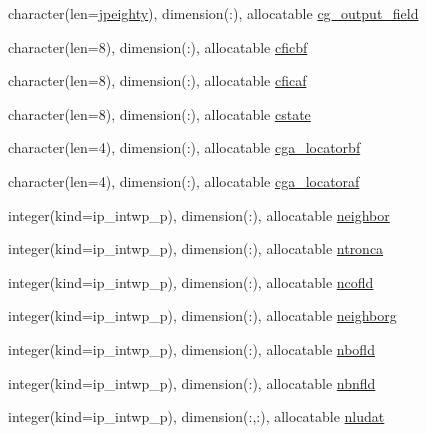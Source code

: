 \begin{DoxyCompactItemize}
\item 
character(len=\hyperlink{namespacemod__oasis__namcouple_a4fb10ad6e864dcbe34c4a8b02204a523}{jpeighty}), dimension(\+:), allocatable \hyperlink{namespacemod__oasis__namcouple_a1b680bf476776f3db085dc1f0009736c}{cg\+\_\+output\+\_\+field}
\item 
character(len=8), dimension(\+:), allocatable \hyperlink{namespacemod__oasis__namcouple_a9e90e47fd11ff4dd95c61dcf3ec872ff}{cficbf}
\item 
character(len=8), dimension(\+:), allocatable \hyperlink{namespacemod__oasis__namcouple_a9b3c7c879a3ff2b5eb15cbcaf5a8a1d9}{cficaf}
\item 
character(len=8), dimension(\+:), allocatable \hyperlink{namespacemod__oasis__namcouple_a4b507ab44ad62713c9e3d83ded6be3f4}{cstate}
\item 
character(len=4), dimension(\+:), allocatable \hyperlink{namespacemod__oasis__namcouple_ac22155599e9b49d57514dd1f7dc9928a}{cga\+\_\+locatorbf}
\item 
character(len=4), dimension(\+:), allocatable \hyperlink{namespacemod__oasis__namcouple_a6f4080d45f0b9be5a0466967f535b83b}{cga\+\_\+locatoraf}
\item 
integer(kind=ip\+\_\+intwp\+\_\+p), dimension(\+:), allocatable \hyperlink{namespacemod__oasis__namcouple_a298c9165785ae1a41f89597cadd211e7}{neighbor}
\item 
integer(kind=ip\+\_\+intwp\+\_\+p), dimension(\+:), allocatable \hyperlink{namespacemod__oasis__namcouple_aaf9fd5eaa5d115f2548b8f78cdcd172d}{ntronca}
\item 
integer(kind=ip\+\_\+intwp\+\_\+p), dimension(\+:), allocatable \hyperlink{namespacemod__oasis__namcouple_a9f8a2a4f44b1c56860fef8df014339d3}{ncofld}
\item 
integer(kind=ip\+\_\+intwp\+\_\+p), dimension(\+:), allocatable \hyperlink{namespacemod__oasis__namcouple_a883d88938c50264711c53af2b555c3db}{neighborg}
\item 
integer(kind=ip\+\_\+intwp\+\_\+p), dimension(\+:), allocatable \hyperlink{namespacemod__oasis__namcouple_a21400200658d24cbf7484b5eb177c911}{nbofld}
\item 
integer(kind=ip\+\_\+intwp\+\_\+p), dimension(\+:), allocatable \hyperlink{namespacemod__oasis__namcouple_af0c7b1e7e49159c6b9c0dc3663264346}{nbnfld}
\item 
integer(kind=ip\+\_\+intwp\+\_\+p), dimension(\+:,\+:), allocatable \hyperlink{namespacemod__oasis__namcouple_abb7c2cd3a371bbb8ccd6a272d0e9b60f}{nludat}
\item 

\end{DoxyCompactItemize}

